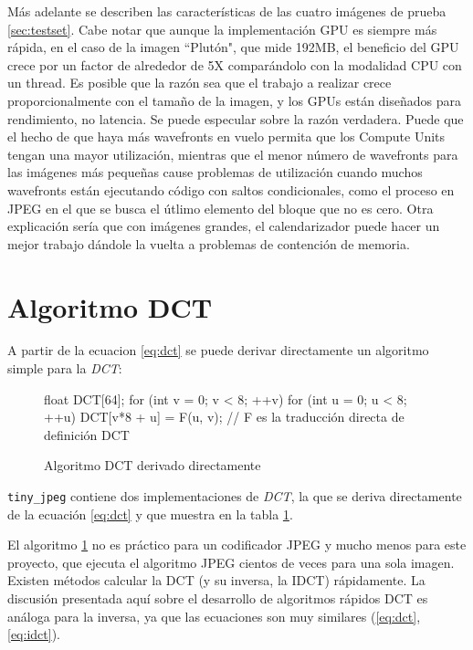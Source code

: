 {Más adelante se describen las características de las cuatro imágenes de prueba
\ref{sec:testset}. Cabe notar que aunque la implementación GPU es siempre más
rápida, en el caso de la imagen ``Plutón", que mide 192MB, el beneficio del GPU
crece por un factor de alrededor de 5X comparándolo con la modalidad CPU con un
thread. Es posible que la razón sea que el trabajo a realizar crece
proporcionalmente con el tamaño de la imagen, y los GPUs están diseñados para
rendimiento, no latencia. Se puede especular sobre la razón verdadera. Puede
que el hecho de que haya más wavefronts en vuelo permita que los Compute Units
tengan una mayor utilización, mientras que el menor número de wavefronts para
las imágenes más pequeñas cause problemas de utilización cuando muchos
wavefronts están ejecutando código con saltos condicionales, como el proceso en
JPEG en el que se busca el útlimo elemento del bloque que no es cero. Otra
explicación sería que con imágenes grandes, el calendarizador puede hacer un
mejor trabajo dándole la vuelta a problemas de contención de memoria.


\section{Algoritmo DCT} \label{sec:DCT}

A partir de la ecuacion \ref{eq:dct} se puede derivar directamente un algoritmo
simple para la \emph{DCT}:

\begin{figure}
    \begin{code}[language=C][h]
        float DCT[64];
        for (int v = 0; v < 8; ++v) {
            for (int u = 0; u < 8; ++u) {
                DCT[v*8 + u] = F(u, v);
                // F es la traducción directa de definición DCT
            }
        }
    \end{code}
    \caption{Algoritmo DCT derivado directamente}
    \label{alg:dct}
\end{figure}

\verb+tiny_jpeg+ contiene dos implementaciones de \emph{DCT}, la que se deriva
directamente de la ecuación \ref{eq:dct} y que muestra en la tabla \ref{alg:dct}.

El algoritmo \ref{alg:dct} no es práctico para un codificador JPEG y mucho
menos para este proyecto, que ejecuta el algoritmo JPEG cientos de veces para
una sola imagen. Existen métodos calcular la DCT (y su inversa, la IDCT)
rápidamente. La discusión presentada aquí sobre el desarrollo de algoritmos
rápidos DCT es análoga para la inversa, ya que las ecuaciones son muy similares
(\ref{eq:dct}, \ref{eq:idct}).

}
